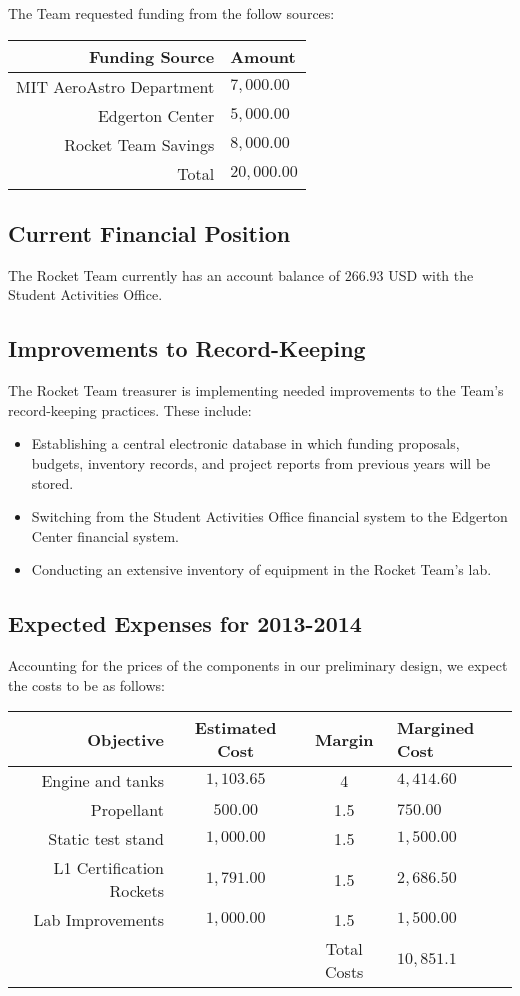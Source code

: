 \documentclass{article}
\begin{document}
The Team requested funding from the follow sources:\\
\begin{tabular}{r | l}
Funding Source & Amount \\
\hline
MIT AeroAstro Department & $7,000.00$\\
Edgerton Center & $5,000.00$\\
Rocket Team Savings & $8,000.00$\\
\hline
Total & $20,000.00$\\
\end{tabular}

\subsection*{Current Financial Position}
The Rocket Team currently has an account balance of $266.93$ USD with the Student Activities Office.
\subsection*{Improvements to Record-Keeping}
The Rocket Team treasurer is implementing needed improvements to the Team's record-keeping practices. These include:\\
\begin{itemize}
\item Establishing a central electronic database in which funding proposals, budgets, inventory records, and project reports from previous years will be stored.
\item Switching from the Student Activities Office financial system to the Edgerton Center financial system.
\item Conducting an extensive inventory of equipment in the Rocket Team's lab.
\end{itemize}
\subsection*{Expected Expenses for 2013-2014}
Accounting for the prices of the components in our preliminary design, we expect the costs to be as follows:\\
\begin{tabular}{r | c | c || l}
Objective & Estimated Cost & Margin & Margined Cost \\
\hline
Engine and tanks & $1,103.65$ & 4 & $4,414.60$ \\
Propellant & $500.00$ & 1.5 & $750.00$ \\
Static test stand & $1,000.00$ & 1.5 & $1,500.00$ \\
L1 Certification Rockets & $1,791.00$ & 1.5 & $2,686.50$ \\
Lab Improvements & $1,000.00$ & 1.5 & $1,500.00$ \\
\hline
 & & Total Costs & $10,851.1$ \\
\end{tabular}
\end{document}
